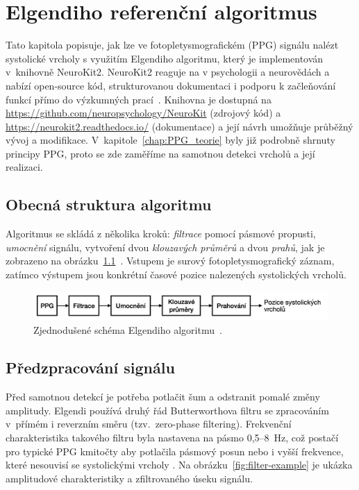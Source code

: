 \chapter{Elgendiho referenční algoritmus}
\label{chap:elgendi_neurokit}

Tato kapitola popisuje, jak lze ve fotopletysmografickém (\acs{PPG}) signálu nalézt systolické vrcholy s využitím Elgendiho algoritmu, který je implementován v~knihovně NeuroKit2.
NeuroKit2 reaguje na  v psychologii a neurovědách a nabízí open-source kód, strukturovanou dokumentaci i podporu k začleňování funkcí přímo do výzkumných prací~\cite{NeuroKit2}.
Knihovna je dostupná na \url{https://github.com/neuropsychology/NeuroKit} (zdrojový kód) a \url{https://neurokit2.readthedocs.io/} (dokumentace) a její návrh umožňuje průběžný vývoj a modifikace.
V~kapitole~\ref{chap:PPG_teorie} byly již podrobně shrnuty principy \acs{PPG}, proto se zde zaměříme na samotnou detekci vrcholů a její realizaci.

\section{Obecná struktura algoritmu}
Algoritmus se skládá z několika kroků: \emph{filtrace} pomocí pásmové propusti, \emph{umocnění} signálu, vytvoření dvou \emph{klouzavých průměrů} a dvou \emph{prahů}, jak je zobrazeno na obrázku~\ref{fig:alg-scheme}~\cite{Elgendi2013}.
Vstupem je surový fotopletysmografický záznam, zatímco výstupem jsou konkrétní časové pozice nalezených systolických vrcholů.

\begin{figure}[htbp]
	\centering
	\includegraphics[width=1\textwidth]{./obrazky/ElgendiBlokSchema.png}
	\caption[Struktura Elgendiho algoritmu]{Zjednodušené schéma Elgendiho algoritmu~\cite{Elgendi2013}.}
	\label{fig:alg-scheme}
\end{figure}

\section{Předzpracování signálu}
Před samotnou detekcí je potřeba potlačit šum a odstranit pomalé změny amplitudy.
Elgendi používá druhý řád Butterworthova filtru se zpracováním v~přímém i reverzním směru (tzv.~zero-phase filtering).
Frekvenční charakteristika takového filtru byla nastavena na pásmo 0,5--8~Hz, což postačí pro typické PPG kmitočty aby potlačila pásmový posun nebo i vyšší frekvence, které nesouvisí se systolickými vrcholy \cite{Elgendi2013}.
Na obrázku~\ref{fig:filter-example} je ukázka amplitudové charakteristiky a zfiltrovaného úseku signálu.

